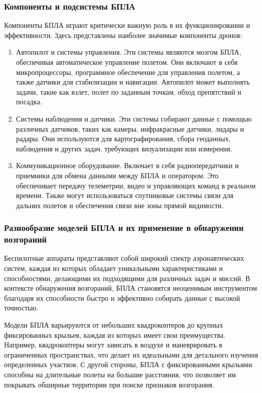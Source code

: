 \subsubsection{Компоненты и подсистемы БПЛА}
Компоненты БПЛА играют критически важную роль в их функционировании и эффективности. 
Здесь представлены наиболее значимые компоненты дронов:
\begin{enumerate}
	\item Автопилот и системы управления. Эти системы являются мозгом БПЛА, обеспечивая автоматическое управление полетом. Они включают в себя микропроцессоры, программное обеспечение для управления полетом, а также датчики для стабилизации и навигации. Автопилот может выполнять задачи, такие как взлет, полет по заданным точкам, обход препятствий и посадка.
	\item Системы наблюдения и датчики. Эти системы собирают данные с помощью различных датчиков, таких как камеры, инфракрасные датчики, лидары и радары. Они используются для картографирования, сбора геоданных, наблюдения и других задач, требующих визуализации или измерения.
	\item Коммуникационное оборудование. Включает в себя радиопередатчики и приемники для обмена данными между БПЛА и оператором. Это обеспечивает передачу телеметрии, видео и управляющих команд в реальном времени. Также могут использоваться спутниковые системы связи для дальних полетов и обеспечения связи вне зоны прямой видимости.
\end{enumerate}

\subsubsection{Разнообразие моделей БПЛА и их применение в обнаружении возгораний}
Беспилотные аппараты представляют собой широкий спектр аэронавтических систем, каждая из которых обладает уникальными характеристиками и способностями, делающими их подходящими для различных задач и миссий. В контексте обнаружения возгораний, БПЛА становятся неоценимым инструментом благодаря их способности быстро и эффективно собирать данные с высокой точностью.

Модели БПЛА варьируются от небольших квадрокоптеров до крупных фиксированных крыльев, каждая из которых имеет свои преимущества. Например, квадрокоптеры могут зависать в воздухе и маневрировать в ограниченных пространствах, что делает их идеальными для детального изучения определенных участков. С другой стороны, БПЛА с фиксированными крыльями способны на длительные полеты на большие расстояния, что позволяет им покрывать обширные территории при поиске признаков возгорания.

